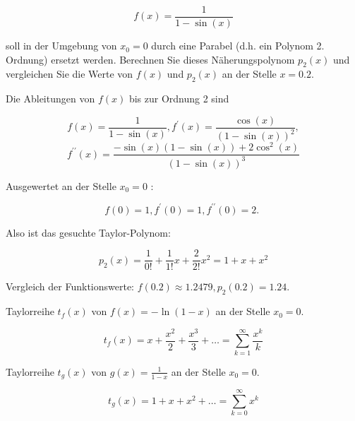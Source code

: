 \begin{example}


$$
f(x)=\frac{1}{1-\sin (x)}
$$

soll in der Umgebung von $x_{0}=0$ durch eine Parabel (d.h. ein Polynom 2. Ordnung) ersetzt werden. Berechnen Sie dieses Näherungspolynom $p_{2}(x)$ und vergleichen Sie die Werte von $f(x)$ und $p_{2}(x)$ an der Stelle $x=0.2$.
\tcblower

Die Ableitungen von $f(x)$ bis zur Ordnung 2 sind

$$
f(x)=\frac{1}{1-\sin (x)}, f^{\prime}(x)=\frac{\cos (x)}{(1-\sin (x))^{2}}, $$$$f^{\prime \prime}(x)=\frac{-\sin (x)(1-\sin (x))+2 \cos ^{2}(x)}{(1-\sin (x))^{3}}
$$

Ausgewertet an der Stelle $x_{0}=0$ :

$$
f(0)=1, f^{\prime}(0)=1, f^{\prime \prime}(0)=2 \text {. }
$$

Also ist das gesuchte Taylor-Polynom:

$$
p_{2}(x)=\frac{1}{0!}+\frac{1}{1!} x+\frac{2}{2!} x^{2}=1+x+x^{2}
$$

Vergleich der Funktionswerte: $f(0.2) \approx 1.2479, p_{2}(0.2)=1.24$.
\end{example}

\begin{example}
    Taylorreihe $t_{f}(x)$ von $f(x)=-\ln (1-x)$ an der Stelle $x_{0}=0$.
    
    $$
t_{f}(x)=x+\frac{x^{2}}{2}+\frac{x^{3}}{3}+\ldots=\sum_{k=1}^{\infty} \frac{x^{k}}{k}
$$
\end{example}
\begin{example}
Taylorreihe $t_{g}(x)$ von $g(x)=\frac{1}{1-x}$ an der Stelle $x_{0}=0$.


$$
t_{g}(x)=1+x+x^{2}+\ldots=\sum_{k=0}^{\infty} x^{k}
$$

\end{example}

